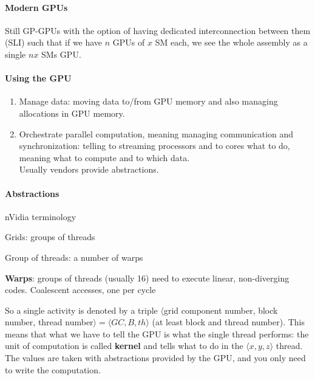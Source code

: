 \documentclass[10pt]{report}
\begin{document}
\paragraph{Modern GPUs} Still GP-GPUs with the option of having dedicated interconnection between them (SLI) such that if we have $n$ GPUs of $x$ SM each, we see the whole assembly as a single $nx$ SMs GPU.
\paragraph{Using the GPU}
\begin{enumerate}
	\item Manage data: moving data to/from GPU memory and also managing allocations in GPU memory.
	\item Orchestrate parallel computation, meaning managing communication and synchronization: telling to streaming processors and to cores what to do, meaning what to compute and to which data.\\
	Usually vendors provide abstractions.
\end{enumerate}
\paragraph{Abstractions} nVidia terminology
\begin{list}{}{}
	\item Grids: groups of threads
	\item Group of threads: a number of warps
	\item \textbf{Warps}: groups of threads (usually 16) need to execute linear, non-diverging codes. Coalescent accesses, one per cycle
\end{list}
So a single activity is denoted by a triple $\langle$grid component number, block number, thread number$\rangle = \langle GC, B, th\rangle$ (at least block and thread number). This means that what we have to tell the GPU is what the single thread performs: the unit of computation is called \textbf{kernel} and tells what to do in the $\langle x,y,z\rangle$ thread. The values are taken with abstractions provided by the GPU, and you only need to write the computation.
\end{document}
